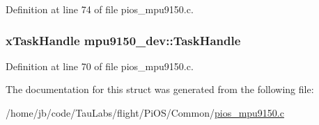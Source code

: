 \-Definition at line 74 of file pios\-\_\-mpu9150.\-c.

\hypertarget{structmpu9150__dev_a07df540feb0b5cfc8c3e1ba77da60293}{
\subsubsection[{\-Task\-Handle}]{\setlength{\rightskip}{0pt plus 5cm}x\-Task\-Handle {\bf mpu9150\-\_\-dev\-::\-Task\-Handle}}}\label{structmpu9150__dev_a07df540feb0b5cfc8c3e1ba77da60293}


\-Definition at line 70 of file pios\-\_\-mpu9150.\-c.



\-The documentation for this struct was generated from the following file\-:\begin{DoxyCompactItemize}
\item 
/home/jb/code/\-Tau\-Labs/flight/\-Pi\-O\-S/\-Common/\hyperlink{pios__mpu9150_8c}{pios\-\_\-mpu9150.\-c}\end{DoxyCompactItemize}
